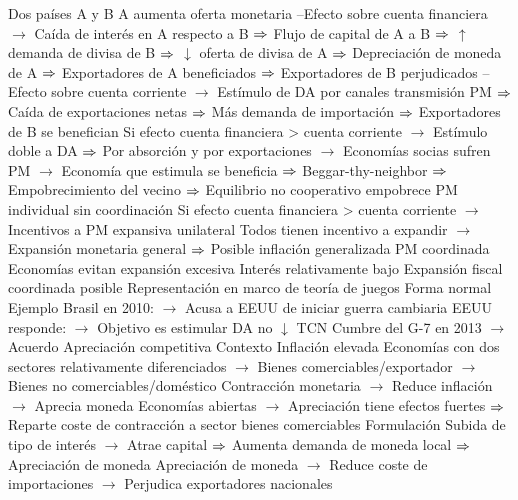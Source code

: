 \documentclass{nuevotema}
\begin{document}
\begin{esquemal}
				\4[] Dos países A y B
				\4[] A aumenta oferta monetaria
				\4[] --Efecto sobre cuenta financiera
				\4[] $\to$ Caída de interés en A respecto a B
				\4[] $\Rightarrow$ Flujo de capital de A a B
				\4[] $\Rightarrow$ $\uparrow$ demanda de divisa de B
				\4[] $\Rightarrow$ $\downarrow$ oferta de divisa de A
				\4[] $\Rightarrow$ Depreciación de moneda de A
				\4[] $\Rightarrow$ Exportadores de A beneficiados
				\4[] $\Rightarrow$ Exportadores de B perjudicados
				\4[] --Efecto sobre cuenta corriente
				\4[] $\to$ Estímulo de DA por canales transmisión PM
				\4[] $\Rightarrow$ Caída de exportaciones netas
				\4[] $\Rightarrow$ Más demanda de importación
				\4[] $\Rightarrow$ Exportadores de B se benefician
				\4[] Si efecto cuenta financiera > cuenta corriente
				\4[] $\to$ Estímulo doble a DA
				\4[] $\Rightarrow$ Por absorción y por exportaciones
				\4[] $\to$ Economías socias sufren PM
				\4[] $\to$ Economía que estimula se beneficia
				\4[] $\Rightarrow$ Beggar-thy-neighbor
				\4[] $\Rightarrow$ Empobrecimiento del vecino
				\4[] $\Rightarrow$ Equilibrio no cooperativo empobrece
				\4 PM individual sin coordinación
				\4[] Si efecto cuenta financiera > cuenta corriente
				\4[] $\to$ Incentivos a PM expansiva unilateral
				\4[] Todos tienen incentivo a expandir
				\4[] $\to$ Expansión monetaria general
				\4[] $\Rightarrow$ Posible inflación generalizada
				\4 PM coordinada
				\4[] Economías evitan expansión excesiva
				\4[] Interés relativamente bajo
				\4[] Expansión fiscal coordinada posible
				\4 Representación en marco de teoría de juegos
				\4[] Forma normal
				\4[] 
				\4 Ejemplo
				\4[] Brasil en 2010:
				\4[] $\to$ Acusa a EEUU de iniciar guerra cambiaria
				\4[] EEUU responde:
				\4[] $\to$ Objetivo es estimular DA no $\downarrow$ TCN
				\4[] Cumbre del G-7 en 2013
				\4[] $\to$ Acuerdo
			\3 Apreciación competitiva
				\4 Contexto
				\4[] Inflación elevada
				\4[] Economías con dos sectores relativamente diferenciados
				\4[] $\to$ Bienes comerciables/exportador
				\4[] $\to$ Bienes no comerciables/doméstico
				\4[] Contracción monetaria
				\4[] $\to$ Reduce inflación
				\4[] $\to$ Aprecia moneda
				\4[] Economías abiertas
				\4[] $\to$ Apreciación tiene efectos fuertes
				\4[] $\Rightarrow$ Reparte coste de contracción a sector bienes comerciables
				\4 Formulación
				\4[] Subida de tipo de interés
				\4[] $\to$ Atrae capital
				\4[] $\Rightarrow$ Aumenta demanda de moneda local
				\4[] $\Rightarrow$ Apreciación de moneda
				\4[] Apreciación de moneda
				\4[] $\to$ Reduce coste de importaciones
				\4[] $\to$ Perjudica exportadores nacionales

\end{esquemal}
\end{document}
